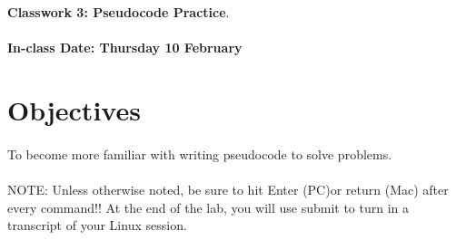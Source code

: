 \documentclass[letter,11pt]{article}
\begin{document}
\huge
\textbf{Classwork 3: Pseudocode Practice}.
\normalsize
\\ ~~ \\
\textbf{In-class Date: Thursday  10 February}

\section*{Objectives}
\paragraph{}To become more familiar with writing pseudocode to solve problems.
\paragraph{}NOTE: Unless otherwise noted, be sure to hit Enter (PC)or return (Mac) after every command!! At the end of the lab, you will use submit to turn in a transcript of your Linux session. %
\end{document}
